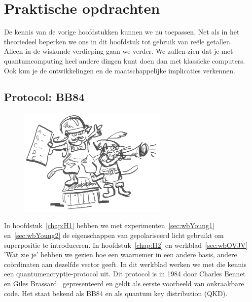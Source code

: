 \documentclass[../../main.tex]{subfiles}
\begin{document}
\onlyinsubfile{
\setcounter{chapter}{3}
}
\notinsubfile{}
\chapter{Praktische opdrachten}\label{chap:H4}
De kennis van de vorige hoofdstukken kunnen we nu toepassen. Net als in het theoriedeel beperken we ons in dit hoofdstuk tot gebruik van re\"ele getallen. Alleen in de wiskunde verdieping gaan we verder. We zullen zien dat je met quantumcomputing heel andere dingen kunt doen dan met klassieke computers. Ook kun je de ontwikkelingen en de maatschappelijke implicaties verkennen.


\section{Protocol: BB84}\label{sec:poBB84}
\begin{figure}
\centering
  \vskip-1cm
\includegraphics[width=0.65\textwidth]{./img/protocol.jpg}
\end{figure}
In hoofdstuk~\ref{chap:H1} hebben we met experimenten~\ref{sec:wbYoung1} en~\ref{sec:wbYoung2} de eigenschappen van gepolariseerd licht gebruikt om superpositie te introduceren. In hoofdstuk~\ref{chap:H2} en werkblad~\ref{sec:wbOVJV} 'Wat zie je' hebben we gezien hoe een waarnemer in een andere basis, andere co\"ordinaten aan dezelfde vector geeft. In dit werkblad werken we met die kennis een quantumencryptie-protocol uit. Dit protocol is in 1984 door Charles Bennet en Giles Brassard~\citep{BENNETT20147} gepresenteerd en geldt als eerste voorbeeld van onkraakbare code. Het staat bekend als BB84 en als quantum key distribution (QKD).
\end{document}
